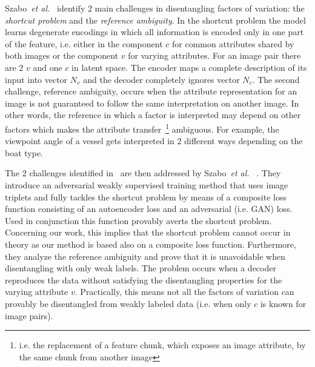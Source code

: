 \documentclass[12pt,a4paper]{article}
\begin{document}
Szabo~\textit{et al.}~\cite{ChallengInDisentIFoF} identify 2 main challenges in disentangling factors of variation: the \textit{shortcut problem} and the \textit{reference ambiguity}. In the shortcut problem the model learns degenerate encodings in which all information is encoded only in one part of the feature, i.e. either in the component $c$ for common attributes shared by both images or the component $v$ for varying attributes. For an image pair there are 2 $v$ and one $c$ in latent space. The encoder maps a complete description of its input into vector $N_v$ and the decoder completely ignores vector $N_c$.
The second challenge, reference ambiguity, occurs when the attribute representation for an image is not guaranteed to follow the same interpretation on another image. In other words, the reference in which a factor is interpreted may depend on other factors which makes the attribute transfer~\footnote{i.e. the replacement of a feature chunk, which exposes an image attribute, by the same chunk from another image} ambiguous. For example, the viewpoint angle of a vessel gets interpreted in 2 different ways depending on the boat type.
\par The 2 challenges identified in~\cite{ChallengInDisentIFoF} are then addressed by Szabo~\textit{et al.}~ \cite{UnderstDegenAndAmbInAT}. They introduce an adversarial weakly supervised training method that uses image triplets and fully tackles the shortcut problem by means of a composite loss function consisting of an autoencoder loss and an adversarial (i.e. GAN) loss. Used in conjunction this function provably averts the shortcut problem. Concerning our work, this implies that the shortcut problem cannot occur in theory as our method is based also on a composite loss function. Furthermore, they analyze the reference ambiguity and prove that it is unavoidable when disentangling with only weak labels. The problem occurs when a decoder reproduces the data without satisfying the disentangling properties for the varying attribute $v$. Practically, this means not all the factors of variation can provably be disentangled from weakly labeled data (i.e. when only $c$ is known for image pairs).    
\end{document}
